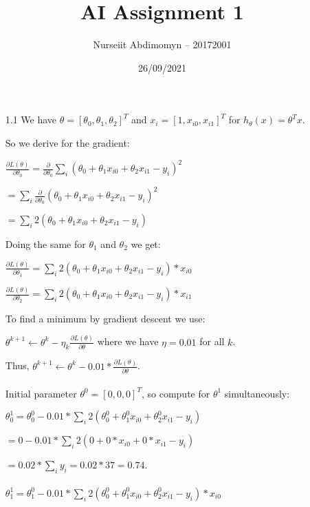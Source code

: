 \documentclass[12pt]{article}
\title{AI Assignment 1}
\author{Nurseiit Abdimomyn -- 20172001}
\date{26/09/2021}
\begin{document}
\maketitle

\begin{enumerate}
  \item[1.1]
  We have $\theta = [\theta_0, \theta_1, \theta_2]^T$ and $x_i = [1, x_{i0}, x_{i1}]^T$
  for $h_\theta(x) = \theta^T x$.

  So we derive for the gradient:

  $\frac{\partial L(\theta)}{\partial \theta_0} = 
  \frac{\partial}{\partial \theta_0} \sum\limits_{i} (\theta_0 + \theta_1 x_{i0} + \theta_2 x_{i1} - y_i)^2$

  $= \sum\limits_{i} \frac{\partial}{\partial \theta_0} (\theta_0 + \theta_1 x_{i0} + \theta_2 x_{i1} - y_i)^2$
  
  $= \sum\limits_{i} 2 (\theta_0 + \theta_1 x_{i0} + \theta_2 x_{i1} - y_i)$

  Doing the same for $\theta_1$ and $\theta_2$ we get:

  $\frac{\partial L(\theta)}{\partial \theta_1} = \sum\limits_{i} 2 (\theta_0 + \theta_1 x_{i0} + \theta_2 x_{i1} - y_i) * x_{i0}$
  
  $\frac{\partial L(\theta)}{\partial \theta_2} = \sum\limits_{i} 2 (\theta_0 + \theta_1 x_{i0} + \theta_2 x_{i1} - y_i) * x_{i1}$


  To find a minimum by gradient descent we use:

  $\theta^{k + 1} \gets \theta^k - \eta_k \frac{\partial L(\theta)}{\partial \theta}$ where we have $\eta = 0.01$ for all $k$.

  Thus, $\theta^{k + 1} \gets \theta^k - 0.01 * \frac{\partial L(\theta)}{\partial \theta}$. \\ \\


  Initial parameter $\theta^0 = [0, 0, 0]^T$, so compute for $\theta^1$ simultaneously:

  $\theta^1_0 = \theta^0_0 - 0.01 * \sum\limits_{i} 2 (\theta^0_0 + \theta^0_1 x_{i0} + \theta^0_2 x_{i1} - y_i)$

  $= 0 - 0.01 * \sum\limits_{i} 2 (0 + 0 * x_{i0} + 0 * x_{i1} - y_i)$
  
  $= 0.02 * \sum\limits_{i} y_i = 0.02 * 37 = 0.74$. \\ \\


  $\theta^1_1 = \theta^0_1 - 0.01 * \sum\limits_{i} 2 (\theta^0_0 + \theta^0_1 x_{i0} + \theta^0_2 x_{i1} - y_i) * x_{i0}$


\end{enumerate}
\end{document}
